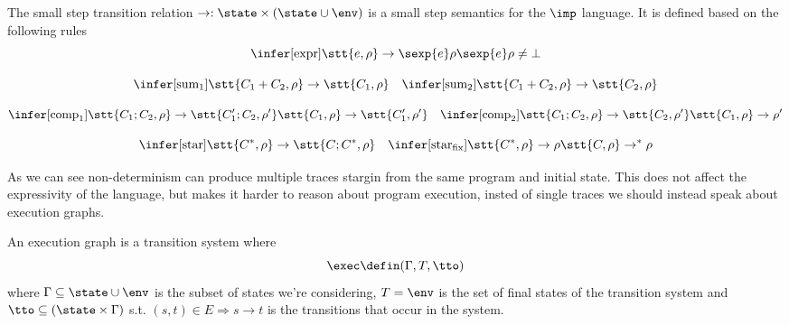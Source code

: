 \begin{definition}\label{def:sosem}
  The small step transition relation \(\to : \state \times (\state
  \cup \env)\) is a small step semantics for the
  \(\imp\) language. It is defined based on the following rules
  \[\infer[\text{expr}]
          {\stt{e, \rho} \to \sexp{e}\rho}
          {\sexp{e}\rho \neq \bot}\]
          
          \[\infer[\text{sum}_1]
                  {\stt{C_1 + C_2, \rho} \to \stt{C_1, \rho}}
                  {} \quad
                  \infer[\text{sum}_2]
                        {\stt{C_1 + C_2, \rho} \to \stt{C_2, \rho}}
                        {}\]
                        
                        \[\infer[\text{comp}_1]
                                {\stt{C_1; C_2, \rho} \to \stt{C_1'; C_2, \rho'}}
                                {\stt{C_1, \rho} \to \stt{C_1', \rho'}} \quad
                                \infer[\text{comp}_2]
                                      {\stt{C_1; C_2, \rho} \to \stt{C_2, \rho'}}
                                      {\stt{C_1, \rho} \to \rho'}\]

                                      \[\infer[\text{star}]
                                              {\stt{C^*, \rho} \to \stt{C;C^*, \rho}}
                                              {} \quad
                                              \infer[\text{star}_{\text{fix}}]
                                                    {\stt{C^*, \rho} \to \rho}
                                                    {\stt{C, \rho} \to^* \rho}\]
\end{definition}

As we can see non-determinism can produce multiple traces stargin from
the same program and initial state. This does not affect the
expressivity of the language, but makes it harder to reason about
program execution, insted of single traces we should instead speak
about execution graphs.

\begin{definition}
  An execution graph is a transition system where \[\exec \defin
  (\Gamma, T, \tto)\] where \(\Gamma \subseteq \state \cup \env\) is
  the subset of states we're considering, \(T = \env\) is the set of
  final states of the transition system and \(\tto \subseteq (\state
  \times \Gamma)\) s.t. \((s,t) \in E \Rightarrow s \to t\) is the
  transitions that occur in the system.
\end{definition}

